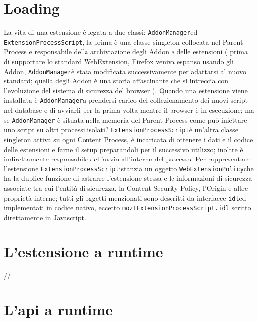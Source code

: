 \documentclass{sapthesis}
\newcommand{\code}[1]{\texttt{#1}}
\newcommand{\idl}{\code{idl}}
\newcommand{\AddonManager}{\code{AddonManager}}
\newcommand{\ExtensionProcessScript}{\code{ExtensionProcessScript}}
\newcommand{\WebExtensionPolicy}{\code{WebExtensionPolicy}}
\begin{document}
    \section{ Loading }
        La vita di una estensione è legata a due classi: \AddonManager ed \ExtensionProcessScript,
        la prima è una classe singleton collocata nel Parent Process e responsabile della archiviazione
        degli Addon e delle estensioni ( prima di supportare lo standard WebExtension, Firefox veniva espanso
        usando gli Addon, \AddonManager è stata modificata successivamente per adattarsi al nuovo standard; quella degli
        Addon è una storia affascinante che si intreccia con l'evoluzione del sistema di sicurezza del browser ).
        Quando una estensione viene installata è \AddonManager a prendersi carico del collezionamento dei nuovi
        script nel database e di avviarli per la prima volta mentre il browser è in esecuzione; ma se \AddonManager
        è situata nella memoria del Parent Process come può iniettare uno script su altri processi isolati?
        \ExtensionProcessScript è un'altra classe singleton attiva su ogni Content Process, è incaricata di
        ottenere i dati e il codice delle estensioni e farne il setup preparandoli per il successivo utilizzo;
        inoltre è indirettamente responsabile dell'avvio all'interno del processo. Per rappresentare l'estensione
        \ExtensionProcessScript istanzia un oggetto \WebExtensionPolicy che ha la duplice funzione di astrarre
        l'estensione stessa e le informazioni di sicurezza associate tra cui l'entità di sicurezza,
        la Content Security Policy, l'Origin e altre proprietà interne; tutti gli oggetti menzionati sono
        descritti da interfacce \idl ed implementati in codice nativo, eccetto \code{mozIExtensionProcessScript.idl}
        scritto direttamente in Javascript.
         
    \section{}


    \section{L'estensione a runtime}
        //
    
    \section{L'api a runtime}
    \label{sec:webextension-api-rpc}
\end{document}
